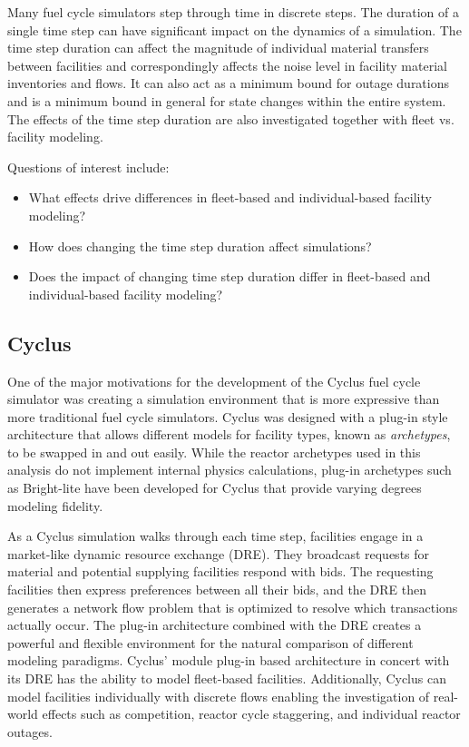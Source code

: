 \documentclass{style}
\begin{document}
Many fuel cycle simulators step through time in discrete steps.  The duration
of a single time step can have significant impact on the dynamics of a
simulation.  The time step duration can affect the magnitude of individual
material transfers between facilities and correspondingly affects the noise
level in facility material inventories and flows.  It can also act as a
minimum bound for outage durations and is a minimum bound in general for state
changes within the entire system. The effects of the time step duration are
also investigated together with fleet vs. facility modeling.

Questions of interest include:

\begin{itemize}

    \item What effects drive differences in fleet-based and individual-based
        facility modeling?

    \item How does changing the time step duration affect simulations?

    \item Does the impact of changing time step duration differ in fleet-based
        and individual-based facility modeling?

\end{itemize}

\subsection{Cyclus}

One of the major motivations for the development of the Cyclus fuel cycle
simulator \cite{cyclus-fundamentals-2016} was creating a simulation environment that is
more expressive than more traditional fuel cycle simulators.  Cyclus was
designed with a plug-in style architecture that allows different models for
facility types, known as \emph{archetypes}, to be swapped in and out easily.
While the reactor archetypes used in this analysis do not implement
internal physics calculations, plug-in archetypes such as Bright-lite
\cite{flanagan_bright-lite_2014} have been developed for Cyclus that provide
varying degrees modeling fidelity.

As a Cyclus simulation walks through each time step, facilities engage in a
market-like dynamic resource exchange (DRE).  They broadcast requests for
material and potential supplying facilities respond with bids. The requesting facilities then
express preferences between all their bids, and the DRE then generates a network
flow problem that is optimized to resolve which transactions actually occur.
The plug-in architecture combined with the DRE creates a powerful and flexible
environment for the natural comparison of different modeling paradigms.
Cyclus' module plug-in based architecture in concert with its DRE has the ability to
model fleet-based facilities.  Additionally, Cyclus can model
facilities individually with discrete flows enabling the investigation of
real-world effects such as competition, reactor cycle staggering,
and individual reactor outages. 
\end{document}
